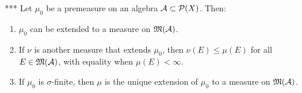     \begin{theorem}\label{thm:premeasure}***
        Let $\mu_0$ be a premeasure on an algebra $\mathcal{A} \subset \mathcal{P}(X)$. Then:
        \begin{enumerate}[label = (\arabic*),itemsep=1pt,topsep=3pt]
            \item $\mu_0$ can be extended to a measure on $\mathfrak{M}(\mathcal{A})$.
            \item If $\nu$ is another measure that extends $\mu_0$, then $\nu(E) \leq \mu(E)$ for all $E \in \mathfrak{M}(\mathcal{A})$, with equality when $\mu(E) < \infty$.
            \item If $\mu_0$ is $\sigma$-finite, then $\mu$ is the unique extension of $\mu_0$ to a measure on $\mathfrak{M}(\mathcal{A})$.
        \end{enumerate}
    \end{theorem}
